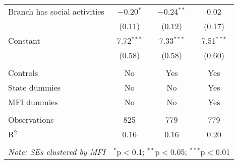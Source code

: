 \documentclass[11pt]{article}
\begin{document}
\begin{table}[!htbp]
\begin{tabular}{@{\extracolsep{5pt}}lccc}
  Branch has social activities & $-$0.20$^{*}$ & $-$0.24$^{**}$ & 0.02 \\ 
  & (0.11) & (0.12) & (0.17) \\ 
  Constant & 7.72$^{***}$ & 7.33$^{***}$ & 7.51$^{***}$ \\ 
  & (0.58) & (0.58) & (0.60) \\ 
 \hline \\[-1.8ex] 
Controls & No & Yes & Yes \\ 
State dummies & No & No & Yes \\ 
MFI dummies & No & No & Yes \\ 
\hline \\[-1.8ex] 
Observations & 825 & 779 & 779 \\ 
R$^{2}$ & 0.16 & 0.16 & 0.20 \\ 
\hline 
\hline \\[-1.8ex] 
\textit{Note: SEs clustered by MFI}  & \multicolumn{3}{r}{$^{*}$p$<$0.1; $^{**}$p$<$0.05; $^{***}$p$<$0.01} \\ 
\end{tabular} 
\end{table} 
\end{document}
